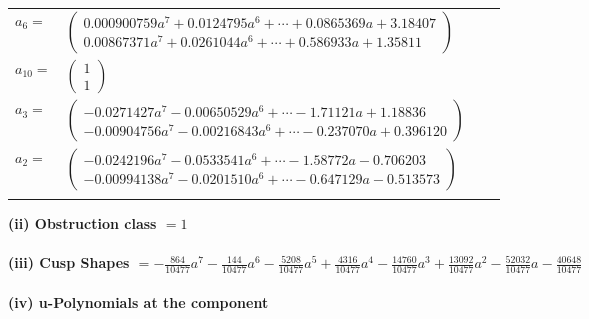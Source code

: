 \documentclass[1p]{elsarticle_modified}
\theoremstyle{definition}
\begin{document}
\begin{tabular}{m{7pt} m{180pt} m{7pt} m{180pt} }
\flushright $a_{6}=$&$\begin{pmatrix}0.000900759 a^{7}+0.0124795 a^{6}+\cdots+0.0865369 a+3.18407\\0.00867371 a^{7}+0.0261044 a^{6}+\cdots+0.586933 a+1.35811\end{pmatrix}$ \\
\flushright $a_{10}=$&$\begin{pmatrix}1\\1\end{pmatrix}$ \\
\flushright $a_{3}=$&$\begin{pmatrix}-0.0271427 a^{7}-0.00650529 a^{6}+\cdots-1.71121 a+1.18836\\-0.00904756 a^{7}-0.00216843 a^{6}+\cdots-0.237070 a+0.396120\end{pmatrix}$ \\
\flushright $a_{2}=$&$\begin{pmatrix}-0.0242196 a^{7}-0.0533541 a^{6}+\cdots-1.58772 a-0.706203\\-0.00994138 a^{7}-0.0201510 a^{6}+\cdots-0.647129 a-0.513573\end{pmatrix}$\\&\end{tabular}
\flushleft \textbf{(ii) Obstruction class $= 1$}\\~\\
\flushleft \textbf{(iii) Cusp Shapes $= -\frac{864}{10477} a^7-\frac{144}{10477} a^6-\frac{5208}{10477} a^5+\frac{4316}{10477} a^4-\frac{14760}{10477} a^3+\frac{13092}{10477} a^2-\frac{52032}{10477} a-\frac{40648}{10477}$}\\~\\
\newpage\renewcommand{\arraystretch}{1}
\flushleft \textbf{(iv) u-Polynomials at the component}\newline \\
\end{document}
